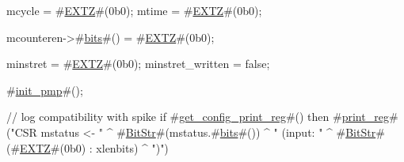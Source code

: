 {  mcycle          = #\hyperref[sailRISCVzEXTZ]{EXTZ}#(0b0);
  mtime           = #\hyperref[sailRISCVzEXTZ]{EXTZ}#(0b0);

  mcounteren->#\hyperref[sailRISCVzbits]{bits}#() = #\hyperref[sailRISCVzEXTZ]{EXTZ}#(0b0);

  minstret           = #\hyperref[sailRISCVzEXTZ]{EXTZ}#(0b0);
  minstret_written   = false;

  #\hyperref[sailRISCVzinitzypmp]{init\_pmp}#();

  // log compatibility with spike
  if   #\hyperref[sailRISCVzgetzyconfigzyprintzyreg]{get\_config\_print\_reg}#()
  then #\hyperref[sailRISCVzprintzyreg]{print\_reg}#("CSR mstatus <- " ^ #\hyperref[sailRISCVzBitStr]{BitStr}#(mstatus.#\hyperref[sailRISCVzbits]{bits}#()) ^ " (input: " ^ #\hyperref[sailRISCVzBitStr]{BitStr}#(#\hyperref[sailRISCVzEXTZ]{EXTZ}#(0b0) : xlenbits) ^ ")")
}
